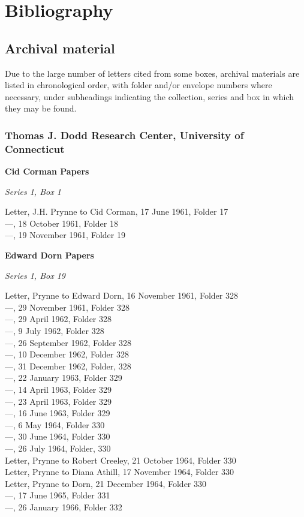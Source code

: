 \documentclass[]{article}
\begin{document}
\setlength{\parindent}{0pt}

\section{Bibliography}\label{bibliography}

\subsection{Archival material}\label{archival-material}

Due to the large number of letters cited from some boxes, archival
materials are listed in chronological order, with folder and/or envelope
numbers where necessary, under subheadings indicating the collection,
series and box in which they may be found.

\subsubsection{Thomas J. Dodd Research Center, University of
Connecticut}\label{thomas-j.-dodd-research-center-university-of-connecticut}

\textbf{Cid Corman Papers}

\emph{Series 1, Box 1}

Letter, J.H. Prynne to Cid Corman, 17 June 1961, Folder 17\\
---, 18 October 1961, Folder 18\\
---, 19 November 1961, Folder 19

\textbf{Edward Dorn Papers}

\emph{Series 1, Box 19}

Letter, Prynne to Edward Dorn, 16 November 1961, Folder 328\\
---, 29 November 1961, Folder 328\\
---, 29 April 1962, Folder 328\\
---, 9 July 1962, Folder 328\\
---, 26 September 1962, Folder 328\\
---, 10 December 1962, Folder 328\\
---, 31 December 1962, Folder, 328\\
---, 22 January 1963, Folder 329\\
---, 14 April 1963, Folder 329\\
---, 23 April 1963, Folder 329\\
---, 16 June 1963, Folder 329\\
---, 6 May 1964, Folder 330\\
---, 30 June 1964, Folder 330\\
---, 26 July 1964, Folder, 330\\
Letter, Prynne to Robert Creeley, 21 October 1964, Folder 330\\
Letter, Prynne to Diana Athill, 17 November 1964, Folder 330\\
Letter, Prynne to Dorn, 21 December 1964, Folder 330\\
---, 17 June 1965, Folder 331\\
---, 26 January 1966, Folder 332
\end{document}

